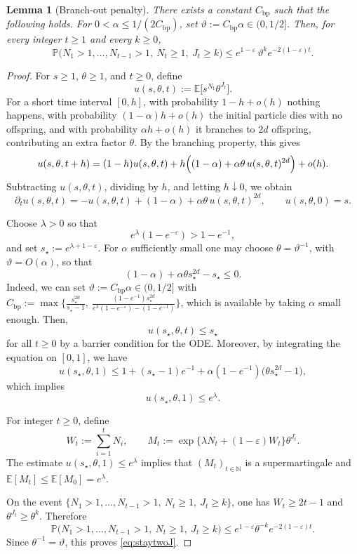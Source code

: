\documentclass[letterpaper,11pt,reqno]{amsart}
\newtheorem{lem}[thm]{Lemma}
\theoremstyle{definition}
\begin{document}
\begin{lem}[Branch-out penalty]\label{lem:branch-penalty}
There exists a constant \(C_{\mathrm{bp}}\) such that the following holds. 
For $0<\alpha\le 1/({2C_{\mathrm{bp}}})$, set $\vartheta:=C_{\mathrm{bp}}\alpha\in(0,1/2]$. 
Then, for every integer \(t\ge1\) and every \(k\ge0\),
\begin{equation}\label{eq:staytwoJ}
\mathbb P\bigl(
N_1>1,\ldots,N_{t-1}>1,\ N_t\geq 1,\ J_t\ge k
\bigr)
\le
e^{1-\varepsilon}\,
\vartheta^k e^{-2(1-\varepsilon)t}.
\end{equation}
\end{lem}


\begin{proof}

For \(s\ge1\), \(\theta\ge1\), and \(t\ge0\), define
\[
u(s,\theta,t):=\mathbb E\big[s^{N_t}\theta^{J_t}\big].
\]
For a short time interval \([0,h]\), with probability \(1-h+o(h)\) nothing happens, with
probability \((1-\alpha)h+o(h)\) the initial particle dies with no offspring, and with probability
\(\alpha h+o(h)\) it branches to \(2d\) offspring, contributing an extra factor \(\theta\). By the
branching property, this gives
\[
u(s,\theta,t+h)
=
(1-h)u(s,\theta,t)
+
h\Bigl((1-\alpha)+\alpha\theta\,u(s,\theta,t)^{2d}\Bigr)
+
o(h).
\]
Subtracting \(u(s,\theta,t)\), dividing by \(h\), and letting \(h\downarrow0\), we obtain
\[
\partial_t u(s,\theta,t)
=
-u(s,\theta,t)+(1-\alpha)+\alpha\theta\,u(s,\theta,t)^{2d},
\qquad
u(s,\theta,0)=s.
\]


Choose \(\lambda>0\) so that
\[
    e^\lambda(1-e^{-\varepsilon})>1-e^{-1},
\]
and set \(s_\star:=e^{\lambda+1-\varepsilon}\).
For \(\alpha\) sufficiently small one may choose
\(\theta=\vartheta^{-1}\), with \(\vartheta=O(\alpha)\), so that
\[
    (1-\alpha)+\alpha\theta s_\star^{2d}-s_\star\le0.
\]
Indeed,
we can set $\vartheta:=C_{\mathrm{bp}}\alpha\in(0,1/2]$ with $C_{\mathrm{bp}}:=\max\Big\{\frac{s_\star^{2d}}{s_\star-1},\ \frac{(1-e^{-1})s_\star^{2d}}{e^\lambda(1-e^{-\varepsilon})-(1-e^{-1})}\Big\}$, which is available by taking $\alpha$ small enough.
Then,
\[
u(s_\star,\theta,t)\le s_\star
\]
for all $t\geq 0$ by a barrier condition for the ODE. Moreover, by integrating
the equation on \([0,1]\), we have
\[
u(s_\star ,\theta,1)\le 1+(s_\star-1)e^{-1}+\alpha(1-e^{-1})\big(\theta s_\star^{2d}-1\big),
\]
which implies
\[
    u(s_\star,\theta,1)\le e^\lambda.
\]

For integer \(t\ge0\), define
\[
    W_t:=\sum_{i=1}^t N_i,
    \qquad
    M_t:=\exp\{\lambda N_t+(1-\varepsilon)W_t\}\theta^{J_t}.
\]
The estimate \(u(s_\star,\theta,1)\le e^\lambda\) implies that \((M_t)_{t\in\mathbb N}\) is a
supermartingale and $\mathbb{E}[M_t]\le \mathbb{E}[M_0]= e^\lambda$.


On the event
\(\{N_1>1,\ldots,N_{t-1}>1,\ N_t\geq1,\ J_t\ge k\}\), one has \(W_t\ge2t-1\) and
\(\theta^{J_t}\ge\theta^k\). Therefore
\[
    \mathbb P\bigl(N_1>1,\ldots,N_{t-1}>1,\ N_t\geq1,\ J_t\ge k\bigr)
    \le
     e^{1-\varepsilon}\theta^{-k}e^{-2(1-\varepsilon)t}.
\]
Since \(\theta^{-1}=\vartheta\), this proves \eqref{eq:staytwoJ}.

\end{proof}
\end{document}
